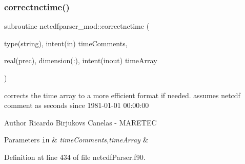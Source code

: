 \subsubsection{\texorpdfstring{correctnctime()}{correctnctime()}}
{\footnotesize\ttfamily subroutine netcdfparser\+\_\+mod\+::correctnctime (\begin{DoxyParamCaption}\item[{type(string), intent(in)}]{time\+Comments,  }\item[{real(prec), dimension(\+:), intent(inout)}]{time\+Array }\end{DoxyParamCaption})\hspace{0.3cm}{\ttfamily [private]}}



corrects the time array to a more efficient format if needed. assumes netcdf comment as \textquotesingle{}seconds since 1981-\/01-\/01 00\+:00\+:00\textquotesingle{} 

\begin{DoxyAuthor}{Author}
Ricardo Birjukovs Canelas -\/ M\+A\+R\+E\+T\+EC 
\end{DoxyAuthor}

\begin{DoxyParams}[1]{Parameters}
\mbox{\tt in}  & {\em time\+Comments,time\+Array} & \\
\hline
\end{DoxyParams}


Definition at line 434 of file netcdf\+Parser.\+f90.


